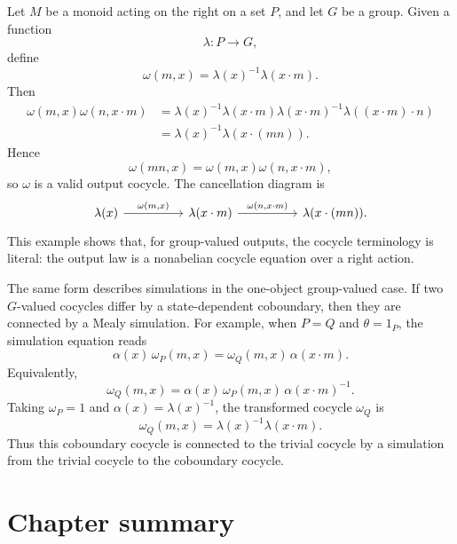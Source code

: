 \begin{example}
\label{example:group-valued-coboundary-outputs}
Let \(M\) be a monoid acting on the right on a set \(P\), and let \(G\) be a
group. Given a function
\[
    \lambda:P\to G,
\]
define
\[
    \omega(m,x)=\lambda(x)^{-1}\lambda(x\cdot m).
\]
Then
\[
\begin{aligned}
    \omega(m,x)\omega(n,x\cdot m)
    &=
    \lambda(x)^{-1}\lambda(x\cdot m)
    \lambda(x\cdot m)^{-1}\lambda((x\cdot m)\cdot n)
    \\
    &=
    \lambda(x)^{-1}\lambda(x\cdot(mn)).
\end{aligned}
\]
Hence
\[
    \omega(mn,x)=\omega(m,x)\omega(n,x\cdot m),
\]
so \(\omega\) is a valid output cocycle. The cancellation diagram is
\[
\begin{tikzcd}[column sep=huge]
    {\lambda(x)}
        \arrow[r, "{\omega(m,x)}"]
    &
    {\lambda(x\cdot m)}
        \arrow[r, "{\omega(n,x\cdot m)}"]
    &
    {\lambda(x\cdot(mn))}.
\end{tikzcd}
\]
This example shows that, for group-valued outputs, the cocycle terminology is
literal: the output law is a nonabelian cocycle equation over a right action.

The same form describes simulations in the one-object group-valued case. If
two \(G\)-valued cocycles differ by a state-dependent coboundary, then they are
connected by a Mealy simulation. For example, when \(P=Q\) and
\(\theta=1_P\), the simulation equation reads
\[
    \alpha(x)\,\omega_P(m,x)
    =
    \omega_Q(m,x)\,\alpha(x\cdot m).
\]
Equivalently,
\[
    \omega_Q(m,x)
    =
    \alpha(x)\,\omega_P(m,x)\,\alpha(x\cdot m)^{-1}.
\]
Taking \(\omega_P=1\) and \(\alpha(x)=\lambda(x)^{-1}\), the transformed
cocycle \(\omega_Q\) is
\[
    \omega_Q(m,x)=\lambda(x)^{-1}\lambda(x\cdot m).
\]
Thus this coboundary cocycle is connected to the trivial cocycle by a
simulation from the trivial cocycle to the coboundary cocycle.
\end{example}

\section{Chapter summary}
\label{sec:chapter-summary}

